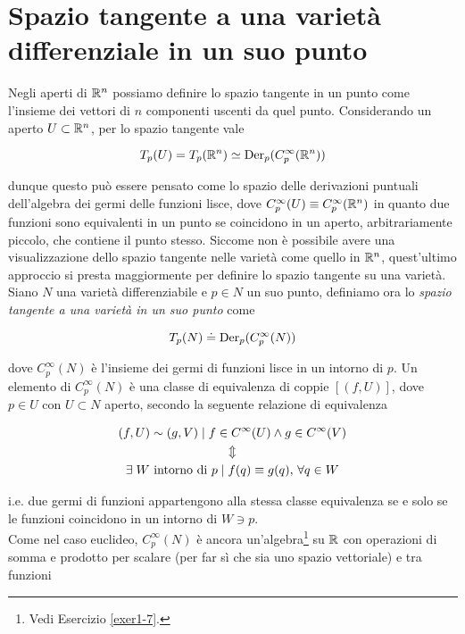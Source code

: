 \section{Spazio tangente a una varietà differenziale in un suo punto}

Negli aperti di $ \mathbb{R}^{n} $ possiamo definire lo spazio tangente in un punto come l'insieme dei vettori di $ n $ componenti uscenti da quel punto. Considerando un aperto $ U \subset \mathbb{R}^{n} $, per lo spazio tangente vale

\begin{equation}
	T_{p}(U) = T_{p}(\mathbb{R}^{n}) \simeq \operatorname{Der}_{p}(C_{p}^{\infty}(\mathbb{R}^{n}))
\end{equation}

dunque questo può essere pensato come lo spazio delle derivazioni puntuali dell'algebra dei germi delle funzioni lisce, dove $ C_{p}^{\infty}(U) \equiv C_{p}^{\infty}(\mathbb{R}^{n}) $ in quanto due funzioni sono equivalenti in un punto se coincidono in un aperto, arbitrariamente piccolo, che contiene il punto stesso. Siccome non è possibile avere una visualizzazione dello spazio tangente nelle varietà come quello in $ \mathbb{R}^{n} $, quest'ultimo approccio si presta maggiormente per definire lo spazio tangente su una varietà. \\
Siano $ N $ una varietà differenziabile e $ p \in N $ un suo punto, definiamo ora lo \textit{spazio tangente a una varietà in un suo punto} come

\begin{equation}
	T_{p}(N) \doteq \operatorname{Der}_{p}(C_{p}^{\infty}(N))
\end{equation}

dove $ C_{p}^{\infty}(N) $ è l'insieme dei germi di funzioni lisce in un intorno di $ p $. Un elemento di $ C_{p}^{\infty}(N) $ è una classe di equivalenza di coppie $ [(f,U)] $, dove $ p \in U $ con $ U \subset N $ aperto, secondo la seguente relazione di equivalenza

\begin{gather}
	(f,U) \sim (g,V) \mid f \in C^{\infty}(U) \wedge g \in C^{\infty}(V) \nonumber \\
	\Updownarrow \\
	\exists \; W \text{ intorno di } p \mid f(q) \equiv g(q) , \, \forall q \in W \nonumber
\end{gather}

i.e. due germi di funzioni appartengono alla stessa classe equivalenza se e solo se le funzioni coincidono in un intorno di $ W \ni p $. \\
Come nel caso euclideo, $ C_{p}^{\infty}(N) $ è ancora un'algebra\footnote{%
	Vedi Esercizio \ref{exer1-7}.%
} su $ \mathbb{R} $ con operazioni di somma e prodotto per scalare (per far sì che sia uno spazio vettoriale) e tra funzioni

